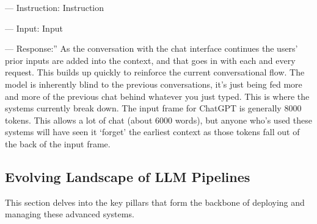 --- Instruction:
Instruction

--- Input:
Input

--- Response:''
As the conversation with the chat interface continues the users' prior inputs are added into the context, and that goes in with each and every request. This builds up quickly to reinforce the current conversational flow. The model is inherently blind to the previous conversations, it's just being fed more and more of the previous chat behind whatever you just typed. This is where the systems currently break down. The input frame for ChatGPT is generally 8000 tokens. This allows a lot of chat (about 6000 words), but anyone who's used these systems will have seen it `forget' the earliest context as those tokens fall out of the back of the input frame.\par 
\subsection{Evolving Landscape of LLM Pipelines}

This section delves into the key pillars that form the backbone of deploying and managing these advanced systems.

